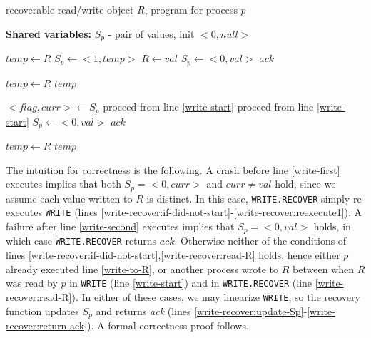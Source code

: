 \begin{algorithm}
	\caption{recoverable read/write object $R$, program for process $p$}
	\label{alg:recoverable-write}
	
	\hspace*{\algorithmicindent} \textbf{Shared variables:}
	$S_p$ - pair of values, init $<0,null>$
	
	\begin{multicols}{2}
	\begin{algorithmic}[1]	
		\State $temp \gets R$ \label{write-start}
		\State $S_p \gets <1,temp>$ \label{write-first}
		\State $R \gets val$ \label{write-to-R}
		\State $S_p \gets <0,val>$ \label{write-second}
		\State \Return $ack$
		\EndProcedure

		 \label{read-first}
        \State $temp \gets R$ \label{read-read-R}
        \State \Return $temp$ \label{read-return}
		\EndProcedure

		
		\columnbreak
		
		\State $<flag, curr> \gets S_p$ \label{write-recover:read-Sp}
		 \label{write-recover:if-did-not-start}
			\State proceed from line \ref{write-start} \label{write-recover:reexecute1}
		 \label{write-recover:read-R}
			\State proceed from line \ref{write-start}
		\EndIf
		\State $S_p \gets <0,val>$ \label{write-recover:update-Sp}
		\State \Return $ack$ \label{write-recover:return-ack}
		\EndProcedure

        \State $temp \gets R$ \label{read-recover-read-R}
        \State \Return $temp$ \label{read-recover-return}
		\EndProcedure \label{read-recover-last}
	\end{algorithmic}
\end{multicols}
\end{algorithm}



The intuition for correctness is the following. A crash before line \ref{write-first} executes implies that both $S_p = {<}0,curr{>}$ and $curr \neq val$ hold, since we assume each value written to $R$ is distinct. In this case, \texttt{WRITE.RECOVER} simply re-executes \texttt{WRITE} (lines \ref{write-recover:if-did-not-start}-\ref{write-recover:reexecute1}). A failure after line \ref{write-second} executes implies that $S_p=<0,val>$ holds, in which case \texttt{WRITE.RECOVER} returns $ack$. Otherwise neither of the conditions of lines \ref{write-recover:if-did-not-start},\ref{write-recover:read-R} holds, hence either $p$ already executed line \ref{write-to-R}, or another process wrote to $R$ between when $R$ was read by $p$ in \texttt{WRITE} (line \ref{write-start}) and in \texttt{WRITE.RECOVER} (line \ref{write-recover:read-R}). In either of these cases, we may linearize \texttt{WRITE}, so the recovery function updates $S_p$ and returns \emph{ack} (lines \ref{write-recover:update-Sp}-\ref{write-recover:return-ack}). A formal correctness proof follows.

